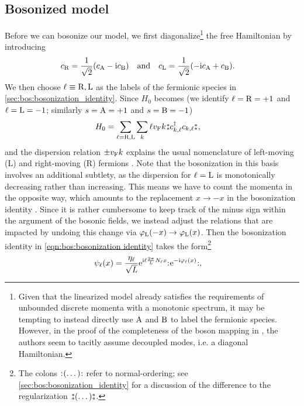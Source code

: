 \subsection{Bosonized model}\label{sec:ell:bos:model_boson}
Before we can bosonize our model, we first diagonalize\footnote{Given that the linearized model already satisfies the requirements of unbounded discrete momenta with a monotonic spectrum, it may be tempting to instead directly use $\text{A}$ and $\text{B}$ to label the fermionic species. However, in the proof of the completeness of the boson mapping in \cite[\sapp B]{Bosonization_DelftSchoeller_1998}, the authors seem to tacitly assume decoupled modes, i.e. a diagonal Hamiltonian.} the free Hamiltonian by introducing
\begin{align*}
c_\R &= \frac{1}{\sqrt{2}} \kla*{c_\A - \i c_\B}\quad\text{and}\quad c_\L = \frac{1}{\sqrt{2}} \kla*{-\i c_\A + c_\B}.
\end{align*}
We then choose $\ell\equiv \text{R},\text{L}$ as the labels of the fermionic species in \autoref{sec:bos:bosonization_identity}.
Since $H_0$ becomes (we identify $\ell=\text{R}=+1$ and $\ell=\text{L}=-1$; similarly $s=\text{A}=+1$ and $s=\text{B}=-1$)
\begin{align}
H_0 &= \sum_{\ell=\R,\L} \sum_k \ell\vf k \varnormord{c_{k,\ell}^\dagger c_{k,\ell}},
\end{align}
and the dispersion relation $\pm v_{\text{F}} k$ explains the usual nomenclature of left-moving (L) and right-moving (R) fermions \cites[]{Bosonization_DelftSchoeller_1998}[]{Giamarchi_2004}. %
Note that the bosonization in this basis involves an additional subtlety, as the dispersion for $\ell=\text{L}$ is monotonically decreasing rather than increasing.
This means we have to count the momenta in the opposite way, which amounts to the replacement $x \rightarrow -x$ in the bosonization identity \cite[\ssec 10.A]{Bosonization_DelftSchoeller_1998}.
Since it is rather cumbersome to keep track of the minus sign within the argument of the bosonic fields, we instead adjust the relations that are impacted by undoing this change via $\varphi_{\text{L}}(-x)\rightarrow \varphi_{\text{L}}(x)$.
Then the bosonization identity in \autoref{eqn:bos:bosonization identity} takes the form\footnote{The colons ${:\mathrel{\mspace{1mu}(\dots)\mspace{1mu}}:}$ refer to normal-ordering; see \autoref{sec:bos:bosonization_identity} for a discussion of the difference to the regularization $\varnormord{(\dots)}$.}
\begin{align*}
\psi_\ell(x) &= \frac{\eta_\ell}{\sqrt{L}} \text{e}^{\text{i} \ell \frac{2\pi}{L} N_\ell x} {:\mathrel{\mspace{1mu}\text{e}^{-\text{i}\varphi_\ell(x)}\mspace{1mu}}:},
\end{align*}
